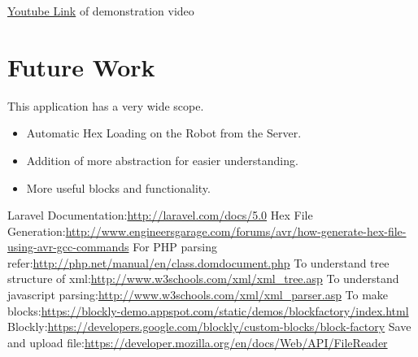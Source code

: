 \documentclass[a4paper,12pt,oneside]{book}
\begin{document}
\href{http://www.youtube.com}{Youtube Link} of demonstration video 

\section{Future Work}
 This application has a very wide scope.
  \begin{itemize}
   \item Automatic Hex Loading on the Robot from the Server.
   \item Addition of more abstraction for easier understanding.
   \item More useful blocks and functionality.
  \end{itemize}
\begin{thebibliography}{li}
Laravel Documentation:\href{http://laravel.com/docs/5.0}{http://laravel.com/docs/5.0} 
Hex File Generation:\href{http://www.engineersgarage.com/forums/avr/how-generate-hex-file-using-avr-gcc-commands}{http://www.engineersgarage.com/forums/avr/how-generate-hex-file-using-avr-gcc-commands} 
For PHP parsing refer:\href{http://php.net/manual/en/class.domdocument.php}{http://php.net/manual/en/class.domdocument.php} 
To understand tree structure of xml:\href{http://www.w3schools.com/xml/xml\_tree.asp}{http://www.w3schools.com/xml/xml\_tree.asp} 
 To understand javascript parsing:\href{http://www.w3schools.com/xml/xml\_parser.asp}{http://www.w3schools.com/xml/xml\_parser.asp} 
To make blocks:\href{https://blockly-demo.appspot.com/static/demos/blockfactory/index.html}{https://blockly-demo.appspot.com/static/demos/blockfactory/index.html} 
Blockly:\href{https://developers.google.com/blockly/custom-blocks/block-factory}{https://developers.google.com/blockly/custom-blocks/block-factory} 
Save and upload file:\href{https://developer.mozilla.org/en/docs/Web/API/FileReader}{https://developer.mozilla.org/en/docs/Web/API/FileReader} 

\end{thebibliography}
\end{document}
